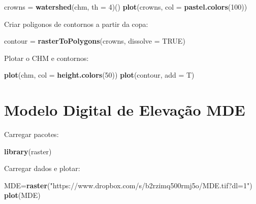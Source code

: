 \documentclass[
]{book}
\newenvironment{Shaded}{\begin{snugshade}}{\end{snugshade}}
\newcommand{\DataTypeTok}[1]{\textcolor[rgb]{0.13,0.29,0.53}{#1}}
\newcommand{\DecValTok}[1]{\textcolor[rgb]{0.00,0.00,0.81}{#1}}
\newcommand{\KeywordTok}[1]{\textcolor[rgb]{0.13,0.29,0.53}{\textbf{#1}}}
\newcommand{\NormalTok}[1]{#1}
\newcommand{\OtherTok}[1]{\textcolor[rgb]{0.56,0.35,0.01}{#1}}
\newcommand{\StringTok}[1]{\textcolor[rgb]{0.31,0.60,0.02}{#1}}
\begin{document}
\begin{Shaded}
\begin{Highlighting}[]
\NormalTok{crowns =}\StringTok{ }\KeywordTok{watershed}\NormalTok{(chm, }\DataTypeTok{th =} \DecValTok{4}\NormalTok{)()}
\KeywordTok{plot}\NormalTok{(crowns, }\DataTypeTok{col =} \KeywordTok{pastel.colors}\NormalTok{(}\DecValTok{100}\NormalTok{))}
\end{Highlighting}
\end{Shaded}

Criar poligonos de contornos a partir da copa:

\begin{Shaded}
\begin{Highlighting}[]
\NormalTok{contour =}\StringTok{ }\KeywordTok{rasterToPolygons}\NormalTok{(crowns, }\DataTypeTok{dissolve =} \OtherTok{TRUE}\NormalTok{)}
\end{Highlighting}
\end{Shaded}

Plotar o CHM e contornos:

\begin{Shaded}
\begin{Highlighting}[]
\KeywordTok{plot}\NormalTok{(chm, }\DataTypeTok{col =} \KeywordTok{height.colors}\NormalTok{(}\DecValTok{50}\NormalTok{))}
\KeywordTok{plot}\NormalTok{(contour, }\DataTypeTok{add =}\NormalTok{ T)}
\end{Highlighting}
\end{Shaded}

\hypertarget{modelo-digital-de-elevauxe7uxe3o-mde}{%
\section{Modelo Digital de Elevação MDE}\label{modelo-digital-de-elevauxe7uxe3o-mde}}

Carregar pacotes:

\begin{Shaded}
\begin{Highlighting}[]
\KeywordTok{library}\NormalTok{(raster)}
\end{Highlighting}
\end{Shaded}

Carregar dados e plotar:

\begin{Shaded}
\begin{Highlighting}[]
\NormalTok{MDE=}\KeywordTok{raster}\NormalTok{(}\StringTok{"https://www.dropbox.com/s/b2rzimq500rmj5o/MDE.tif?dl=1"}\NormalTok{)}
\KeywordTok{plot}\NormalTok{(MDE)}
\end{Highlighting}
\end{Shaded}
\end{document}
